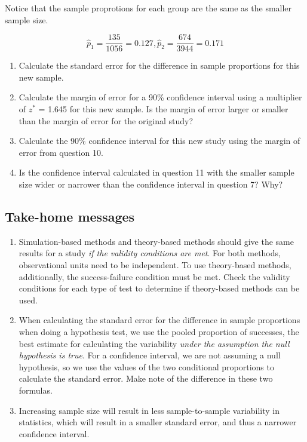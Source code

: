 \documentclass[
]{report}
\begin{document}
Notice that the sample proprotions for each group are the same as the smaller sample size.

\[\hat{p}_1 = \frac{135}{1056}=0.127, \hat{p}_2 = \frac{674}{3944}=0.171\]

\begin{enumerate}
\def\labelenumi{\arabic{enumi}.}
\setcounter{enumi}{8}
\item
  Calculate the standard error for the difference in sample proportions for this new sample.
  \vspace{0.8in}
\item
  Calculate the margin of error for a 90\% confidence interval using a multiplier of \(z^*\) = 1.645 for this new sample. Is the margin of error larger or smaller than the margin of error for the original study?
  \vspace{.8in}
\item
  Calculate the 90\% confidence interval for this new study using the margin of error from question 10.\\
  \vspace{.8in}
\item
  Is the confidence interval calculated in question 11 with the smaller sample size wider or narrower than the confidence interval in question 7? Why?
  \vspace{.8in}
\end{enumerate}

\newpage

\hypertarget{take-home-messages-16}{%
\subsection{Take-home messages}\label{take-home-messages-16}}

\begin{enumerate}
\def\labelenumi{\arabic{enumi}.}
\item
  Simulation-based methods and theory-based methods should give the same results for a study \emph{if the validity conditions are met}. For both methods, observational units need to be independent. To use theory-based methods, additionally, the success-failure condition must be met. Check the validity conditions for each type of test to determine if theory-based methods can be used.
\item
  When calculating the standard error for the difference in sample proportions when doing a hypothesis test, we use the pooled proportion of successes, the best estimate for calculating the variability \emph{under the assumption the null hypothesis is true}. For a confidence interval, we are not assuming a null hypothesis, so we use the values of the two conditional proportions to calculate the standard error. Make note of the difference in these two formulas.
\item
  Increasing sample size will result in less sample-to-sample variability in statistics, which will result in a smaller standard error, and thus a narrower confidence interval.
\end{enumerate}
\end{document}
